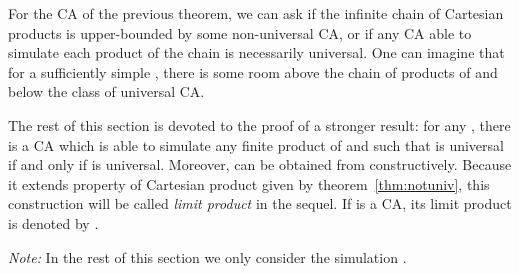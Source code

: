 \documentclass[a4paper]{elsarticle}
\begin{document}
For the CA  of the previous theorem, we can ask if the infinite
chain of Cartesian products is upper-bounded by some non-universal CA, or
if any CA able to simulate each product of the chain is necessarily
universal. One can imagine that for a sufficiently simple ,
there is some room above the chain of products of  and below the
class of universal CA.

The rest of this section is devoted to the proof of a stronger result:
for any , there is a CA  which is able to simulate any
finite product of  and such that  is universal if and only
if  is universal. Moreover,  can be obtained from 
constructively. Because it extends property of Cartesian product given
by theorem~\ref{thm:notuniv}, this construction will be called
\emph{limit product} in the sequel. If  is a CA, its limit
product is denoted by .

\textit{Note: }In the rest of this section we only consider the
simulation . 
\end{document}
